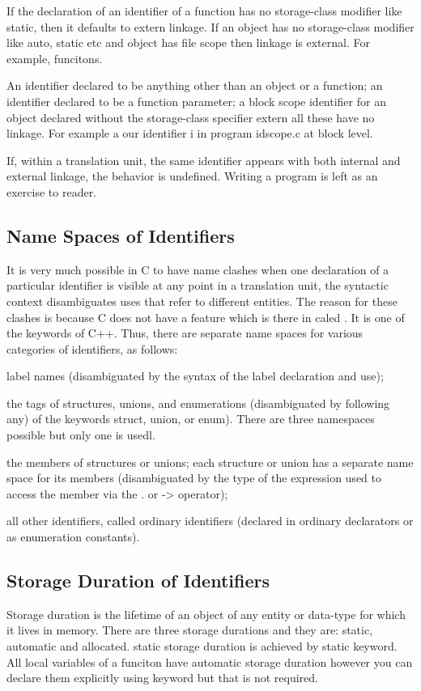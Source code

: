 If the declaration of an identifier of a function has no storage-class
modifier like static, then it defaults to extern linkage. If an
object has no storage-class modifier like auto, static etc and object
has file scope then linkage is external. For example, funcitons.

An identifier declared to be anything other than an object or a
function; an identifier declared to be a function parameter; a block
scope identifier for an object declared without the storage-class
specifier extern all these have no linkage. For example a our
identifier i in program idscope.c at block level.

If, within a translation unit, the same identifier appears with both
internal and external linkage, the behavior is undefined. Writing a
program is left as an exercise to reader.

\subsection{Name Spaces of Identifiers}
It is very much possible in C to have name clashes when one
declaration of a particular identifier is visible at any point in a
translation unit, the syntactic context disambiguates 
uses that refer to different entities. The reason for these clashes is
because C does not have a feature which is there in caled
. It is one of the keywords of C++. Thus, there are
separate name spaces for various categories of identifiers, as follows: 
\startitemize[n]
\item label names (disambiguated by the syntax of the label
  declaration and use); 
\item the tags of structures, unions, and enumerations (disambiguated by following any)
  of the keywords struct, union, or enum). There are three namespaces
  possible but only one is usedl.
\item the members of structures or unions; each structure or union has a separate name
  space for its members (disambiguated by the type of the expression used to access the
  member via the . or -> operator);
\item all other identifiers, called ordinary identifiers (declared
  in ordinary declarators or as enumeration constants).
\stopitemize

\subsection{Storage Duration of Identifiers}
Storage duration is the lifetime of an object of any entity or
data-type for which it lives in memory. There are three storage
durations and they are: static, automatic and allocated. static
storage duration is achieved by static keyword. All local variables of
a funciton have automatic storage duration however you can declare
them explicitly using keyword  but that is not required.

